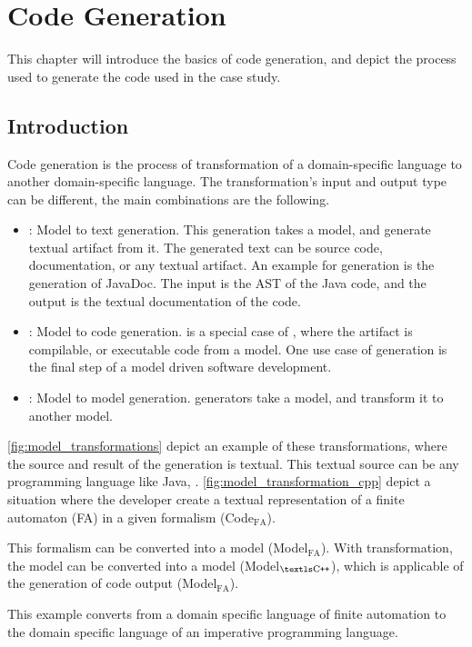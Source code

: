 
\chapter{Code Generation}
\label{ch:codegen}

This chapter will introduce the basics of code generation, and depict the process used to generate the code used in the case study.

\section{Introduction}

Code generation is the process of transformation of a domain-specific language to another domain-specific language. The transformation's input and output type can be different, the main combinations are the following.
\begin{itemize}
	\item \mtt: Model to text generation. This generation takes a model, and generate textual artifact from it. The generated text can be source code, documentation, or any textual artifact. An example for \mtm generation is the generation of JavaDoc. The input is the AST of the Java code, and the output is the textual documentation of the code.
	\item \mtc: Model to code generation. \mtc is a special case of \mtt, where the artifact is compilable, or executable code from a model. One use case of \mtc generation is the final step of a model driven software development.
	\item \mtm: Model to model generation. \mtm generators take a model, and transform it to another model.
\end{itemize}

\cref{fig:model_transformations} depict an example of these transformations, where the source and result of the generation is textual. This textual source can be any programming language like Java, \cpp{}. \cref{fig:model_transformation_cpp} depict a situation where the developer create a textual representation of a finite automaton (FA) in a given formalism (Code$_\text{FA}$).

This formalism can be converted into a model (Model$_\text{FA}$). With \mtm transformation, the model can be converted into a model (Model$_\text{\cpp{}}$), which is applicable of the generation of code output (Model$_\text{FA}$).

This example converts from a domain specific language of finite automation to the domain specific language of an imperative programming language.

